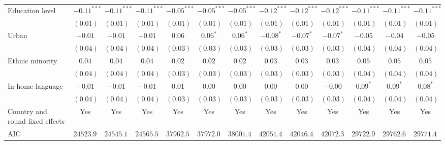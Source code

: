 \begin{table}
\begin{center}
\begin{threeparttable}
\begin{tabular}{l c c c c c c c c c c c c}
Education level                 & $-0.11^{***}$ & $-0.11^{***}$ & $-0.11^{***}$ & $-0.05^{***}$ & $-0.05^{***}$ & $-0.05^{***}$ & $-0.12^{***}$ & $-0.12^{***}$ & $-0.12^{***}$ & $-0.11^{***}$ & $-0.11^{***}$ & $-0.11^{***}$ \\
                                & $(0.01)$      & $(0.01)$      & $(0.01)$      & $(0.01)$      & $(0.01)$      & $(0.01)$      & $(0.01)$      & $(0.01)$      & $(0.01)$      & $(0.01)$      & $(0.01)$      & $(0.01)$      \\
Urban                           & $-0.01$       & $-0.01$       & $-0.01$       & $0.06$        & $0.06^{*}$    & $0.06^{*}$    & $-0.08^{*}$   & $-0.07^{*}$   & $-0.07^{*}$   & $-0.05$       & $-0.04$       & $-0.05$       \\
                                & $(0.04)$      & $(0.04)$      & $(0.04)$      & $(0.03)$      & $(0.03)$      & $(0.03)$      & $(0.03)$      & $(0.03)$      & $(0.03)$      & $(0.04)$      & $(0.04)$      & $(0.04)$      \\
Ethnic minority                 & $0.04$        & $0.04$        & $0.04$        & $0.02$        & $0.02$        & $0.02$        & $0.03$        & $0.03$        & $0.03$        & $0.05$        & $0.05$        & $0.05$        \\
                                & $(0.04)$      & $(0.04)$      & $(0.04)$      & $(0.03)$      & $(0.03)$      & $(0.03)$      & $(0.03)$      & $(0.03)$      & $(0.03)$      & $(0.04)$      & $(0.04)$      & $(0.04)$      \\
In-home language                & $-0.01$       & $-0.01$       & $-0.01$       & $0.01$        & $0.00$        & $0.00$        & $0.00$        & $0.00$        & $-0.00$       & $0.09^{*}$    & $0.09^{*}$    & $0.08^{*}$    \\
                                & $(0.04)$      & $(0.04)$      & $(0.04)$      & $(0.03)$      & $(0.03)$      & $(0.03)$      & $(0.03)$      & $(0.03)$      & $(0.03)$      & $(0.04)$      & $(0.04)$      & $(0.04)$      \\
\midrule
Country and round fixed effects & Yes           & Yes           & Yes           & Yes           & Yes           & Yes           & Yes           & Yes           & Yes           & Yes           & Yes           & Yes           \\
AIC                             & $24523.98$    & $24545.19$    & $24565.54$    & $37962.55$    & $37972.02$    & $38001.44$    & $42051.41$    & $42046.44$    & $42072.32$    & $29722.90$    & $29762.68$    & $29771.46$    \\

\end{tabular}
\end{threeparttable}
\end{center}
\end{table}
